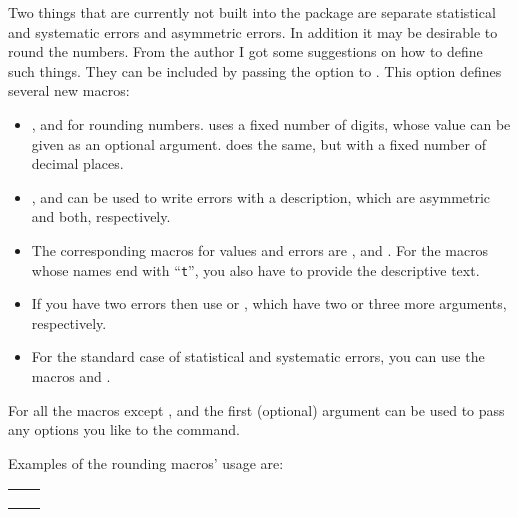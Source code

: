 Two things that are currently not built into the  package
are separate statistical and  systematic errors and asymmetric errors.
In addition it may be desirable to round the numbers.
From the author I got some suggestions on how to define such things.
They can be included by passing the option  to 
.
This option defines several new macros:
\begin{itemize}
  \item {},  and  
    for rounding numbers.
     uses a fixed number of digits,
    whose value can be  given as an optional argument.
     does the same, but with a fixed number of decimal places.
  \item {},  and 
    can be used to write errors with a description,
    which are asymmetric and both, respectively.
  \item The corresponding macros for values and errors are
    ,  and . For the macros
    whose names end with \enquote{\texttt{t}}, you also have to provide
    the descriptive text.
  \item If you have two errors then use 
    or , which have two or three more arguments, respectively.
  \item For the standard case of statistical and systematic
    errors, you can use the macros  and
    .
\end{itemize}
For all the macros except ,  and  
the first (optional) argument can be used to pass any options you like to
the  command.

Examples of the rounding macros' usage are:
\begin{tcblisting}{}
\begin{tabular}{ll}
  \numR{1234.5678}\\
  \numRF{1234.5678} & \numRF[2]{1234.5678}\\
  \numRP{1234.5678} & \numRP[2]{1234.5678}\\
\end{tabular}
\end{tcblisting}

